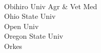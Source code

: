 \documentclass[a4paper]{article}
\begin{document}
\begin{multicols*}{2}
\begin{footnotesize}
 \\ Obihiro Univ Agr \& Vet Med \\ Ohio State Univ \\ Open Univ \\ Oregon State Univ \\ Orkes
\end{footnotesize}
\end{multicols*}
\end{document}
